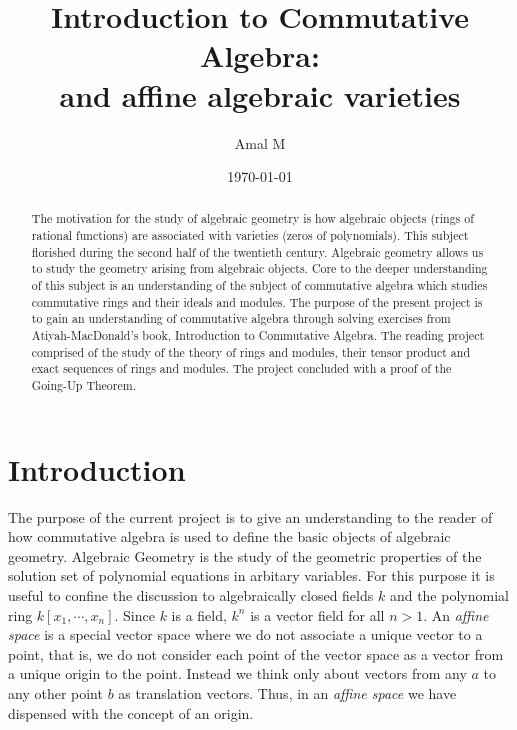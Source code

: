 \documentclass[]{report}
\begin{document}
\title{
    Introduction to Commutative Algebra: \\
    
    \large and affine algebraic varieties}
\author{Amal M}
\date{\today}
\maketitle

\begin{abstract}

    The motivation for the study of algebraic geometry is how algebraic objects (rings of rational functions) are associated with varieties (zeros of polynomials). This subject florished during the second half of the twentieth century. Algebraic geometry allows us to study the geometry arising from algebraic objects. Core to the deeper understanding of this subject is an understanding of the subject of commutative algebra which studies commutative rings and their ideals and modules. The purpose of the present project is to gain an understanding of commutative algebra through solving exercises from Atiyah-MacDonald's book, Introduction to Commutative Algebra. The reading project comprised of the study of the theory of rings and modules, their tensor product and exact sequences of rings and modules. The project concluded with a proof of the Going-Up Theorem.

\end{abstract}

\tableofcontents
\newpage

\chapter{Introduction}

The purpose of the current project is to give an understanding 
to the reader of how commutative algebra is used to define the basic
objects of algebraic geometry. Algebraic Geometry is the study of
the geometric properties of the solution set of polynomial equations
in arbitary variables. For this purpose it is useful to confine the 
discussion to algebraically closed fields $k$ and the polynomial ring
$k[x_1,\cdots,x_n]$. Since $k$ is a field, $k^n$ is a vector field for all $n>1$. An \textit{affine space} is a special vector space where we do not associate a unique vector to a point, that is, we do not consider each point of the vector space as a vector from a unique origin to the point. Instead we think only about vectors from any $a$ to any other point $b$ as translation vectors. Thus, in an \textit{affine space} we have dispensed with the concept of an origin. 
\end{document}
